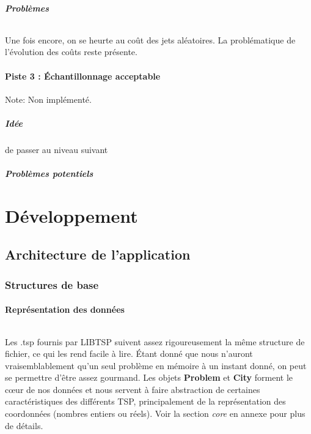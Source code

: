 \documentclass[a4paper,10pt]{report}
\begin{document}

\subsubsection{Problèmes}

\paragraph{}
  Une fois encore, on se heurte au coût des jets aléatoires. La problématique
de l'évolution des coûts reste présente.


\pagebreak
\subsection{Piste 3 : Échantillonnage acceptable}
Note: Non implémenté.
\subsubsection{Idée}
de passer au niveau suivant

\subsubsection{Problèmes potentiels}


\part{Développement}
\chapter{Architecture de l'application}
\section{Structures de base}
\subsection{Représentation des données}
\paragraph{}
  Les .tsp fournis par LIBTSP suivent assez rigoureusement la même structure de
fichier, ce qui les rend facile à lire. Étant donné que nous n'auront
vraisemblablement qu'un seul problème en mémoire à un instant donné, on peut se
permettre d'être assez gourmand. Les objets \textbf{Problem} et \textbf{City}
forment le cœur de nos données et nous servent à faire abstraction de certaines
caractéristiques des différents TSP, principalement de la représentation des
coordonnées (nombres entiers ou réels). Voir la section \textit{core} en annexe
pour plus de détails.
\end{document}
